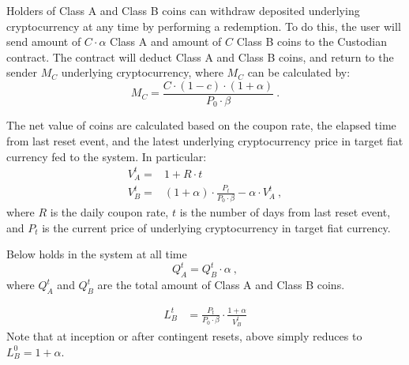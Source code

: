 \documentclass[final,pdftex]{ectaart}
\theoremstyle{plain}
\begin{document}
\begin{appendices}
Holders of Class A and Class B coins can withdraw deposited underlying cryptocurrency at any time by performing a redemption. To do this, the user will send amount of $C\cdot\alpha$ Class A and amount of $C$ Class B coins to the Custodian contract. The contract will deduct Class A and Class B coins, and return to the sender $M_{C}$ underlying cryptocurrency, where $M_{C}$ can be calculated by:
\begin{equation}
M_{C}=\frac{C\cdot\left(1-c\right)\cdot\left(1+\alpha\right)}{P_{0}\cdot\beta}\ .\label{eq:redemption-1}
\end{equation}


The net value of coins are calculated based on the coupon rate, the elapsed time from last reset event, and the latest underlying cryptocurrency price in target fiat currency fed to the system. In particular:
\begin{equation}
\begin{array}{cc}
V_{A}^{t}= & 1+R\cdot t\\
V_{B}^{t}= & \left(1+\alpha\right)\cdot\frac{P_{t}}{P_{0}\cdot\beta}-\alpha\cdot V_{A}^{t}\ ,
\end{array}\label{eq:netvalue-1}
\end{equation}
where $R$ is the daily coupon rate, $t$ is the number of days from last reset event, and $P_{t}$ is the current price of underlying cryptocurrency in target fiat currency.


Below holds in the system at all time
\[
Q_{A}^{t}=Q_{B}^{t}\cdot\alpha\ ,
\]
where $Q_{A}^{t}$ and $Q_{B}^{t}$ are the total amount of Class A and Class B coins.


\begin{align*}
L_{B}^{t} & =\frac{P_{t}}{P_{0}\cdot\beta}\cdot\frac{1+\alpha}{V_{B}^{t}}
\end{align*}
Note that at inception or after contingent resets, above simply reduces to $L_{B}^{0}=1+\alpha$.


\end{appendices}
\end{document}
